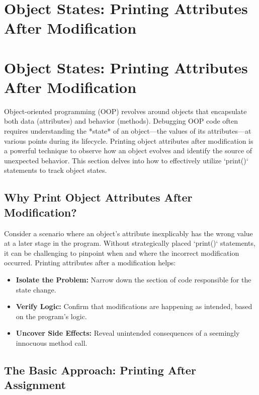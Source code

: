 \documentclass{article}
\begin{document}
{{{%
\newpage

\section*{Object States: Printing Attributes After Modification} %
\label{chapter-3-4-Object_States__Printing_Attributes_After}

\section*{Object States: Printing Attributes After Modification}

Object-oriented programming (OOP) revolves around objects that encapsulate both data (attributes) and behavior (methods). Debugging OOP code often requires understanding the *state* of an object—the values of its attributes—at various points during its lifecycle. Printing object attributes after modification is a powerful technique to observe how an object evolves and identify the source of unexpected behavior. This section delves into how to effectively utilize `print()` statements to track object states.

\subsection*{Why Print Object Attributes After Modification?}

Consider a scenario where an object's attribute inexplicably has the wrong value at a later stage in the program. Without strategically placed `print()` statements, it can be challenging to pinpoint when and where the incorrect modification occurred. Printing attributes after a modification helps:

\begin{itemize}
    \item \textbf{Isolate the Problem:} Narrow down the section of code responsible for the state change.
    \item \textbf{Verify Logic:} Confirm that modifications are happening as intended, based on the program's logic.
    \item \textbf{Uncover Side Effects:} Reveal unintended consequences of a seemingly innocuous method call.
\end{itemize}

\subsection*{The Basic Approach: Printing After Assignment}

}}}
\end{document}
